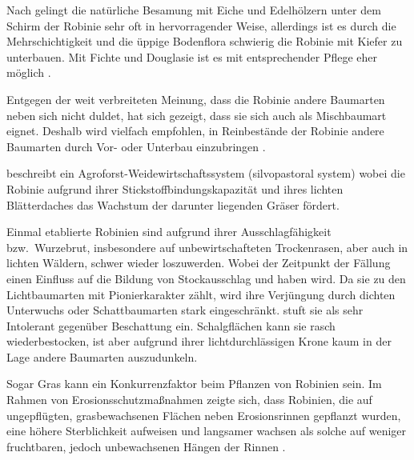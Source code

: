 \documentclass[twocolumn]{scrartcl}
\begin{document}
Nach \citet[S.~19]{erteld1952robinieErtrag}
gelingt die natürliche Besamung mit Eiche und Edelhölzern
unter dem Schirm der Robinie sehr oft in  hervorragender Weise,
allerdings ist es durch die
Mehrschichtigkeit und die üppige Bodenflora schwierig die Robinie mit
Kiefer zu unterbauen. Mit Fichte und Douglasie ist es mit
entsprechender Pflege eher möglich \citep[S.~94]{erteld1952robinieErtrag}.

Entgegen der weit verbreiteten Meinung, dass die Robinie andere
Baumarten neben sich nicht duldet, hat sich gezeigt, dass sie sich
auch als Mischbaumart eignet. Deshalb wird vielfach empfohlen, in
Reinbestände der Robinie andere Baumarten durch Vor- oder Unterbau
einzubringen \citep{ewald2001klone}.

\citet[p.\,467, 586]{ashton2018silviculture} beschreibt ein
Agroforst-Weidewirtschaftssystem (silvopastoral system) wobei die
Robinie aufgrund ihrer Stickstoffbindungskapazität und ihres lichten
Blätterdaches das Wachstum der darunter liegenden Gräser fördert.

Einmal etablierte Robinien sind aufgrund ihrer Ausschlagfähigkeit
bzw.\ Wurzebrut, insbesondere auf unbewirtschafteten Trockenrasen, aber
auch in lichten Wäldern, schwer wieder loszuwerden. Wobei der Zeitpunkt
der Fällung einen Einfluss auf die Bildung von Stockausschlag und
haben wird. Da sie zu den
Lichtbaumarten mit Pionierkarakter zählt, wird ihre Verjüngung durch
dichten Unterwuchs oder Schattbaumarten stark
eingeschränkt.
\citet{baker1949schattentoleranz} stuft sie als sehr Intolerant gegenüber
Beschattung ein.
Schalgflächen kann sie rasch wiederbestocken, ist aber
aufgrund ihrer lichtdurchlässigen Krone kaum in der Lage andere
Baumarten auszudunkeln.

Sogar Gras kann ein Konkurrenzfaktor beim Pflanzen von Robinien
sein. Im Rahmen von Erosionsschutzmaßnahmen zeigte sich, dass
Robinien, die auf ungepflügten, grasbewachsenen Flächen neben
Erosionsrinnen gepflanzt wurden, eine höhere Sterblichkeit aufweisen
und langsamer wachsen als solche auf weniger fruchtbaren, jedoch
unbewachsenen Hängen der Rinnen
\citep{meginnis1934robinie,cooper1950blacklocust}.
\end{document}

